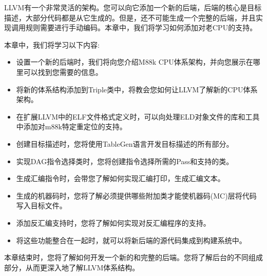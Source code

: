 LLVM有一个非常灵活的架构。您可以向它添加一个新的后端，后端的核心是目标描述，大部分代码都是从它生成的。但是，还不可能生成一个完整的后端，并且实现调用规则需要进行手动编码。本章中，我们将学习如何添加对老CPU的支持。\par

本章中，我们将学习以下内容:\par

\begin{itemize}
\item 设置一个新的后端时，我们将向您介绍M88k CPU体系架构，并向您展示在哪里可以找到您需要的信息。

\item 将新的体系结构添加到Triple类中，将教会您如何让LLVM了解新的CPU体系架构。

\item 在扩展LLVM中的ELF文件格式定义时，可以向处理ELD对象文件的库和工具中添加对m88k特定重定位的支持。

\item 创建目标描述时，您将使用TableGen语言开发目标描述的所有部分。

\item 实现DAG指令选择类时，您将创建指令选择所需的Pass和支持的类。

\item 生成汇编指令时，会带您了解如何实现汇编打印，生成汇编文本。

\item 生成的机器码时，您将了解必须提供哪些附加类才能使机器码(MC)层将代码写入目标文件。

\item 添加反汇编支持时，您将了解如何实现对反汇编程序的支持。

\item 将这些功能整合在一起时，就可以将新后端的源代码集成到构建系统中。
\end{itemize}

本章结束时，您将了解如何开发一个新的和完整的后端。您将了解后台的不同组成部分，从而更深入地了解LLVM体系结构。\par



















